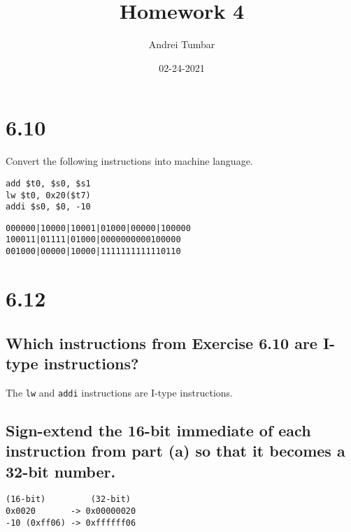 \documentclass[11pt]{article}
\title{\textbf{Homework 4}}
\author{Andrei Tumbar}
\date{02-24-2021}
\def\code#1{\texttt{#1}}
\begin{document}
\maketitle
\thispagestyle{empty}

\section*{6.10}

Convert the following instructions into machine language.

\begin{lstlisting}
add $t0, $s0, $s1
lw $t0, 0x20($t7)
addi $s0, $0, -10
\end{lstlisting}

\begin{lstlisting}
000000|10000|10001|01000|00000|100000
100011|01111|01000|0000000000100000
001000|00000|10000|1111111111110110
\end{lstlisting}

\section*{6.12}
\subsection*{Which instructions from Exercise 6.10 are I-type instructions?}

The \code{lw} and \code{addi} instructions are I-type instructions.

\subsection*{Sign-extend the 16-bit immediate of each instruction from part (a) so that it becomes a 32-bit number.}
\begin{lstlisting}
(16-bit)         (32-bit)
0x0020       -> 0x00000020
-10 (0xff06) -> 0xffffff06
\end{lstlisting}
\end{document}
